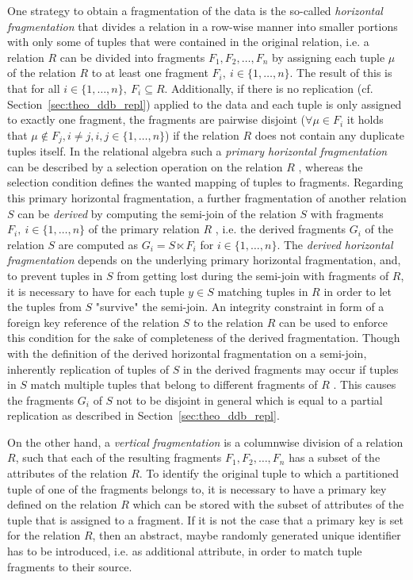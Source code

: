 One strategy to obtain a fragmentation of the data is the so-called \emph{horizontal fragmentation} \cite[p.~105]{Ozsu1991} that divides a relation in a 
row-wise manner into smaller portions with only some of tuples that were contained in the original relation, i.e. a relation $R$ can be divided into fragments
$F_1, F_2,\dots, F_n$ by assigning each tuple $\mu$ of the relation $R$ to at least one fragment $F_i,~i\in\{1,\dots,n\}$. The result of this is that for all 
$i\in\{1,\dots,n\},~F_i \subseteq R$. Additionally, if there is no replication (cf. Section~\ref{sec:theo_ddb_repl}) applied to the data and each tuple is only
assigned to exactly one fragment, the fragments are pairwise disjoint ($\forall \mu \in F_i$ it holds that $\mu \notin F_j, i\neq j, i,j\in\{1,\dots,n\}$) 
if the relation $R$ does not contain any duplicate tuples itself. In the relational algebra such a \emph{primary horizontal fragmentation} can be described by
a selection operation on the relation $R$ \cite[p.~109]{Ozsu1991}, whereas the selection condition defines the wanted mapping of tuples to fragments. 
Regarding this primary horizontal fragmentation, a further fragmentation of another relation $S$ can be \emph{derived} by computing the semi-join of the
relation $S$ with fragments $F_i,~i\in\{1,\dots,n\}$ of the primary relation $R$ \cite[p.~116f.]{Ozsu1991}, i.e. the derived fragments $G_i$ of the relation
$S$ are computed as $G_i=S \ltimes F_i$ for $i\in\{1,\dots,n\}$. The \emph{derived horizontal fragmentation} depends on the underlying primary horizontal
fragmentation, and, to prevent tuples in $S$ from getting lost during the semi-join with fragments of $R$, it is necessary to have for each tuple $y\in S$ 
matching tuples in $R$ in order to let the tuples from $S$ "survive" the semi-join. An integrity constraint in form of a foreign key reference of the relation
$S$ to the relation $R$ can be used to enforce this condition for the sake of completeness of the derived fragmentation. Though with the definition of the 
derived horizontal fragmentation on a semi-join, inherently replication of tuples of $S$ in the derived fragments may occur if tuples in $S$ match multiple
tuples that belong to different fragments of $R$ \cite[p.~121]{Ozsu1991}. This causes the fragments $G_i$ of $S$ not to be disjoint in general which is equal
to a partial replication as described in Section~\ref{sec:theo_ddb_repl}.


On the other hand, a \emph{vertical fragmentation} \cite[p.~122]{Ozsu1991} is a columnwise division of a relation $R$, such that each of the resulting
fragments $F_1,F_2,\dots,F_n$ has a subset of the attributes of the relation $R$. To identify the original tuple to which a partitioned tuple of one of the
fragments belongs to, it is necessary to have a primary key defined on the relation $R$ which can be stored with the subset of attributes of the tuple that is
assigned to a fragment. If it is not the case that a primary key is set for the relation $R$, then an abstract, maybe randomly generated unique identifier has 
to be introduced, i.e. as additional attribute, in order to match tuple fragments to their source. 

